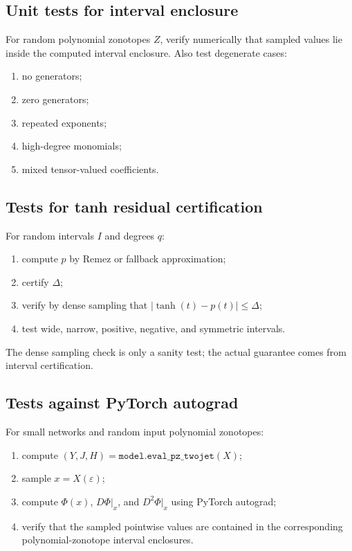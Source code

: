\documentclass[11pt]{article}
\newcommand{\eps}{\varepsilon}
\begin{document}
\subsection{Unit tests for interval enclosure}

For random polynomial zonotopes \(Z\), verify numerically that sampled values lie inside the computed interval enclosure. Also test degenerate cases:
\begin{enumerate}[label=(\roman*)]
    \item no generators;
    \item zero generators;
    \item repeated exponents;
    \item high-degree monomials;
    \item mixed tensor-valued coefficients.
\end{enumerate}

\subsection{Tests for tanh residual certification}

For random intervals \(I\) and degrees \(q\):
\begin{enumerate}[label=(\roman*)]
    \item compute \(p\) by Remez or fallback approximation;
    \item certify \(\Delta\);
    \item verify by dense sampling that \(|\tanh(t)-p(t)|\leq\Delta\);
    \item test wide, narrow, positive, negative, and symmetric intervals.
\end{enumerate}
The dense sampling check is only a sanity test; the actual guarantee comes from interval certification.

\subsection{Tests against PyTorch autograd}

For small networks and random input polynomial zonotopes:
\begin{enumerate}[label=(\roman*)]
    \item compute \((Y,J,H)=\texttt{model.eval\_pz\_twojet}(X)\);
    \item sample \(x=X(\eps)\);
    \item compute \(\Phi(x)\), \(D\Phi|_x\), and \(D^2\Phi|_x\) using PyTorch autograd;
    \item verify that the sampled pointwise values are contained in the corresponding polynomial-zonotope interval enclosures.
\end{enumerate}
\end{document}
